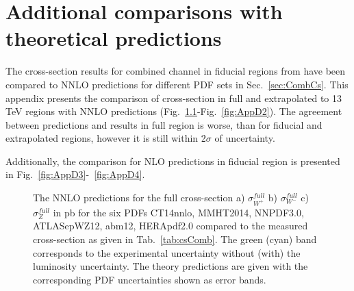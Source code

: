 \chapter{Additional comparisons with theoretical predictions}

The cross-section results for combined channel in fiducial regions from have been compared to NNLO predictions for different PDF sets in Sec.~\ref{sec:CombCs}. This appendix presents the comparison of cross-section in full and extrapolated to 13 TeV regions with NNLO predictions (Fig.~\ref{fig:AppD1}-Fig.~\ref{fig:AppD2}). The agreement between predictions and results in full region is worse, than for fiducial and extrapolated regions, however it is still within 2$\sigma$ of uncertainty. 

Additionally, the comparison for NLO predictions in fiducial region is presented in Fig.~\ref{fig:AppD3}-~\ref{fig:AppD4}.

\begin{figure}[!h]
\begin{minipage}[h]{0.32\linewidth}
\end{minipage}
\hfill
\begin{minipage}[h]{0.32\linewidth}
\end{minipage}
\begin{minipage}[h]{0.32\linewidth}
\end{minipage}
\caption{The NNLO predictions for the full cross-section a) $\sigma^{full}_{W^+}$  b) $\sigma^{full}_{W^-}$  c) $\sigma^{full}_Z$ in pb for the six PDFs CT14nnlo, MMHT2014, NNPDF3.0, ATLASepWZ12, abm12, HERApdf2.0 compared to the measured cross-section as given in Tab.~\ref{tab:csComb}. The green (cyan) band corresponds to the experimental uncertainty without (with) the luminosity uncertainty. The theory predictions are given with the corresponding PDF uncertainties shown as error bands.}
\label{fig:AppD1}
\end{figure}

